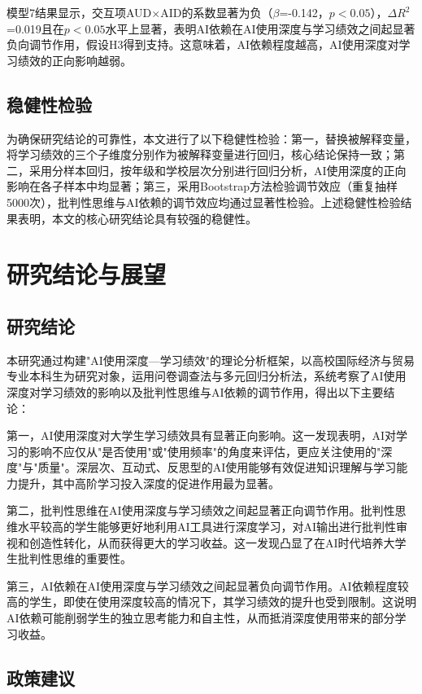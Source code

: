 \documentclass{njtech-thesis}
\begin{document}
模型7结果显示，交互项AUD$\times$AID的系数显著为负（$\beta$=-0.142，$p<0.05$），$\Delta R^2$=0.019且在$p<0.05$水平上显著，表明AI依赖在AI使用深度与学习绩效之间起显著负向调节作用，假设H3得到支持。这意味着，AI依赖程度越高，AI使用深度对学习绩效的正向影响越弱。

\subsection{稳健性检验}

为确保研究结论的可靠性，本文进行了以下稳健性检验：第一，替换被解释变量，将学习绩效的三个子维度分别作为被解释变量进行回归，核心结论保持一致；第二，采用分样本回归，按年级和学校层次分别进行回归分析，AI使用深度的正向影响在各子样本中均显著；第三，采用Bootstrap方法检验调节效应（重复抽样5000次），批判性思维与AI依赖的调节效应均通过显著性检验。上述稳健性检验结果表明，本文的核心研究结论具有较强的稳健性。

\section{研究结论与展望}

\subsection{研究结论}

本研究通过构建"AI使用深度—学习绩效"的理论分析框架，以高校国际经济与贸易专业本科生为研究对象，运用问卷调查法与多元回归分析法，系统考察了AI使用深度对学习绩效的影响以及批判性思维与AI依赖的调节作用，得出以下主要结论：

第一，AI使用深度对大学生学习绩效具有显著正向影响。这一发现表明，AI对学习的影响不应仅从"是否使用"或"使用频率"的角度来评估，更应关注使用的"深度"与"质量"。深层次、互动式、反思型的AI使用能够有效促进知识理解与学习能力提升，其中高阶学习投入深度的促进作用最为显著。

第二，批判性思维在AI使用深度与学习绩效之间起显著正向调节作用。批判性思维水平较高的学生能够更好地利用AI工具进行深度学习，对AI输出进行批判性审视和创造性转化，从而获得更大的学习收益。这一发现凸显了在AI时代培养大学生批判性思维的重要性。

第三，AI依赖在AI使用深度与学习绩效之间起显著负向调节作用。AI依赖程度较高的学生，即使在使用深度较高的情况下，其学习绩效的提升也受到限制。这说明AI依赖可能削弱学生的独立思考能力和自主性，从而抵消深度使用带来的部分学习收益。

\subsection{政策建议}
\end{document}
